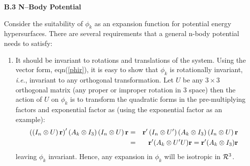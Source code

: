 \vspace{2mm}
\noindent
{\bf B.3 N--Body Potential}

Consider the suitability of $\phi_k$ as an expansion function for potential
energy hypersurfaces. There are several requirements that a general n-body
potential needs to satisfy:

\begin{enumerate}


\item  It should be invariant to rotations 
and translations of the system.
Using the vector form, eqn(\ref{phir}), it is easy to show that $\phi _k$ is
rotationally invariant, {\it i.e.}, 
invariant to any orthogonal transformation.
Let $U$ be any $3\times 3$ orthogonal matrix (any proper or improper
rotation in 3 space) then the action of $U$ on $\phi _k$ is to transform the
quadratic forms in the pre-multiplying factors and exponential factor as
(using the exponential factor as an example): 
\begin{eqnarray}
\left( \left( I_n\otimes U\right) {\bf r}\right) ^{\prime }(A_k\otimes
I_3)\left( I_n\otimes U\right) {\bf r} &=&{\bf r}^{\prime }\left(
I_n\otimes U^{\prime }\right) (A_k\otimes I_3)\left( I_n\otimes U\right) 
{\bf r} \\
&=&{\bf r}^{\prime }(A_k\otimes U^{\prime }U){\bf r} 
= {\bf r}^{\prime }(A_k\otimes I_3){\bf r}
\end{eqnarray}
leaving $\phi _k$ invariant. Hence, any expansion in $\phi _k$ will be
isotropic in ${\cal R}^3$.





\end{enumerate}
